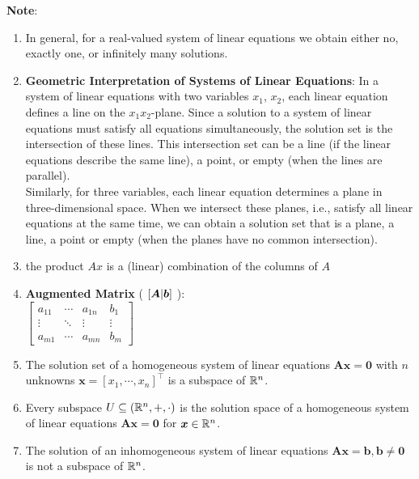 \begin{enumerate}
    
    
\end{enumerate}


\vspace{0.5cm}
\textbf{Note}:
\begin{enumerate}
    \item In general, for a real-valued system of linear equations we obtain either no, exactly one, or infinitely many solutions. 
    \hfill \cite{mfml/book/mml/Deisenroth-Faisal-Ong}

    \item \textbf{Geometric Interpretation of Systems of Linear Equations}: 
    In a system of linear equations with two variables $x_1$, $x_2$, each linear equation defines a line on the $x_1x_2$-plane. Since a solution to a system of linear equations must satisfy all equations simultaneously, the solution set is the intersection of these lines. This intersection set can be a line (if the linear equations describe the same line), a point, or empty (when the lines are parallel).
    \hfill \cite{mfml/book/mml/Deisenroth-Faisal-Ong}
    \\
    Similarly, for three variables, each linear equation determines a plane in three-dimensional space. When we intersect these planes, i.e., satisfy all linear equations at the same time, we can obtain a solution set that is a plane, a line, a point or empty (when the planes have no common intersection).
    \hfill \cite{mfml/book/mml/Deisenroth-Faisal-Ong}

    \item the product $Ax$ is a (linear) combination of the columns of $A$
    \hfill \cite{mfml/book/mml/Deisenroth-Faisal-Ong}

    \item \textbf{Augmented Matrix} ( $\left[\bm{A}|\bm{b}\right]$ ): 
    \\[0.2cm]
    $
        \left[
        \begin{array}{ccc|c}
            a_{11} & \cdots & a_{1n} & b_{1}\\
            \vdots & \ddots & \vdots & \vdots \\
            a_{m1} & \cdots & a_{mn} & b_{m}
        \end{array}
        \right]
    $

    \item The solution set of a homogeneous system of linear equations $\bm{Ax} = \bm{0}$ with $n$ unknowns $\bm{x} = [x_1, \cdots , x_n]^\top$ is a subspace of $\mathbb{R}^n$.
    \hfill \cite{mfml/book/mml/Deisenroth-Faisal-Ong}

    \item Every subspace $U \subseteq (\mathbb{R}^n , +, \cdot)$ is the solution space of a homogeneous system of linear equations $\bm{Ax} = \bm{0}$ for $\bm{x} \in \mathbb{R}^n$.
    \hfill \cite{mfml/book/mml/Deisenroth-Faisal-Ong}

    \item The solution of an inhomogeneous system of linear equations $\bm{Ax} = \bm{b}, \bm{b} \neq \bm{0}$ is not a subspace of $\mathbb{R}^n$.
    \hfill \cite{mfml/book/mml/Deisenroth-Faisal-Ong}

    
\end{enumerate}

